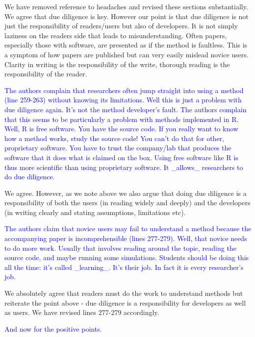 \documentclass[12pt]{letter}
\begin{document}
\begin{letter}{}
We have removed reference to headaches and revised these sections substantially. We agree that due diligence is key. However our point is that due diligence is not just the responsibility of readers/users but also of developers. It is not simply laziness on the readers side that leads to misunderstanding. Often papers, especially those with software, are presented as if the method is faultless. This is a symptom of how papers are published but can very easily mislead novice users. Clarity in writing is the responsibility of the write, thorough reading is the responsibility of the reader.

\textcolor{blue}{The authors complain that researchers often jump straight into using a method (line 259-263) without knowing its limitations. Well this is just a problem with due diligence again. It's not the method developer's fault. The authors complain that this seems to be particularly a problem with methods implemented in R. Well, R is free software. You have the source code. If you really want to know how a method works, study the source code! You can't do that for other, proprietary software. You have to trust the company/lab that produces the software that it does what is claimed on the box. Using free software like R is thus more scientific than using proprietary software. It \_allows\_ researchers to do due diligence.}

We agree. However, as we note above we also argue that doing due diligence is a responsibility of both the users (in reading widely and deeply) and the developers (in writing clearly and stating assumptions, limitations etc). 

\textcolor{blue}{The authors claim that novice users may fail to understand a method because the accompanying paper is incomprehensible (lines 277-279). Well, that novice needs to do more work. Usually that involves reading around the topic, reading the source code, and maybe running some simulations. Students should be doing this all the time: it's called \_learning\_. It's their job. In fact it is every researcher's job.}

We absolutely agree that readers must do the work to understand methods but reiterate the point above - due diligence is a responsibility for developers as well as users. We have revised lines 277-279 accordingly.

\textcolor{blue}{And now for the positive points.}


\end{letter}
\end{document}
